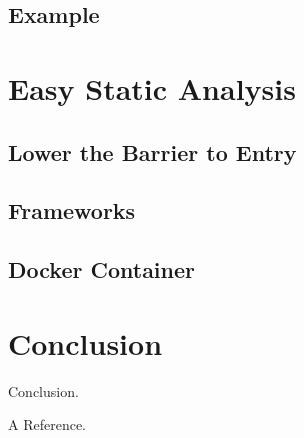 \documentclass[journal]{IEEEtran}
\begin{document}
\subsection{Example}


\section{Easy Static Analysis}

\subsection{Lower the Barrier to Entry}

\subsection{Frameworks}

\subsection{Docker Container}


\section{Conclusion}
Conclusion.



\begin{thebibliography}{00}

 A Reference.

\end{thebibliography}
\end{document}
